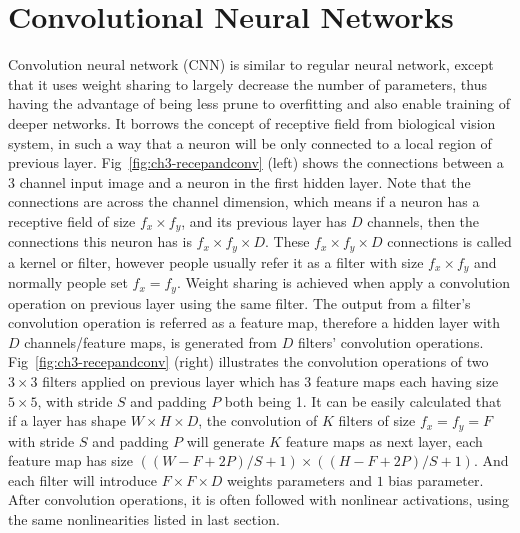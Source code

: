 \section{Convolutional Neural Networks}
Convolution neural network (CNN) is similar to regular neural network, except that it uses weight sharing to largely decrease the number of parameters, thus having the advantage of being less prune to overfitting and also enable training of deeper networks. It borrows the concept of receptive field from biological vision system, in such a way that a neuron will be only connected to a local region of previous layer. Fig~\ref{fig:ch3-recepandconv} (left) shows the connections between a 3 channel input image and a neuron in the first hidden layer. Note that the connections are across the channel dimension, which means if a neuron has a receptive field of size $f_x\times f_y$, and its previous layer has $D$ channels, then the connections this neuron has is $f_x\times f_y \times D$. These $f_x\times f_y\times D$ connections is called a kernel or filter, however people usually refer it as a filter with size $f_x \times f_y$ and normally people set $f_x = f_y$. Weight sharing is achieved when apply a convolution operation on previous layer using the same filter. The output from a filter's convolution operation is referred as a feature map, therefore a hidden layer with $D$ channels/feature maps, is generated from $D$ filters' convolution operations. Fig~\ref{fig:ch3-recepandconv} (right) illustrates the convolution operations of two $3\times 3$ filters applied on previous layer which has 3 feature maps each having size $5\times 5$, with stride $S$ and padding $P$ both being 1. It can be easily calculated that if a layer has shape $W\times H\times D$, the convolution of $K$ filters of size $f_x=f_y=F$ with stride $S$ and padding $P$ will generate $K$ feature maps as next layer, each feature map has size $((W-F+2P)/S+1) \times ((H-F+2P)/S+1)$. And each filter will introduce $F\times F\times D$ weights parameters and $1$ bias parameter. After convolution operations, it is often followed with nonlinear activations, using the same nonlinearities listed in last section.


